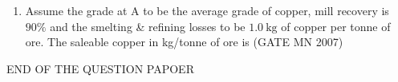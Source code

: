 \documentclass[journal]{IEEEtran}
\begin{document}
\begin{enumerate}
\item Assume the grade at A to be the average grade of copper, mill recovery is $90\%$ and the smelting \& refining losses to be $1.0 \ \mathrm{kg}$ of copper per tonne of ore. The saleable copper in kg/tonne of ore is  
	\hfill (GATE MN 2007)
\begin{enumerate}
\end{enumerate}




\end{enumerate}
\begin{center}                                  
\huge{END OF THE QUESTION PAPOER}    
\end{center}
\end{document}
